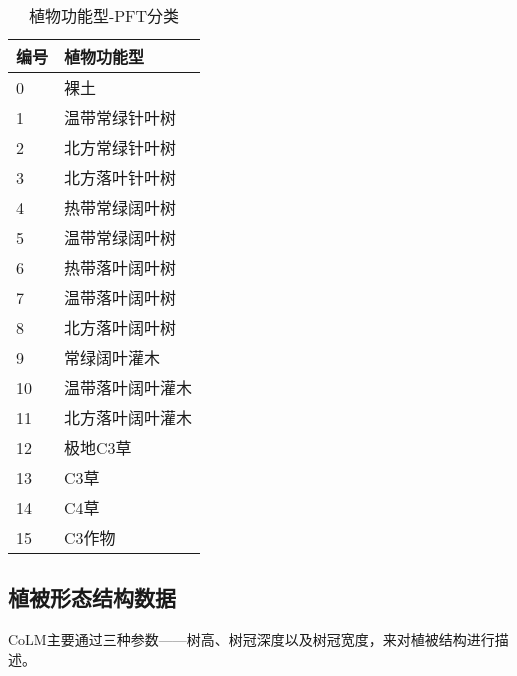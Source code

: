 \begin{table}[htbp]
  \centering
  \caption{植物功能型-PFT分类}
  \label{tab:PFT分类}
  \begin{tabular}{ll}
    \toprule
    \multicolumn{1}{l}{编号} & \multicolumn{1}{l}{植物功能型} \\ \midrule
    0                        & 裸土                           \\
    1                        & 温带常绿针叶树                 \\
    2                        & 北方常绿针叶树                 \\
    3                        & 北方落叶针叶树                 \\
    4                        & 热带常绿阔叶树                 \\
    5                        & 温带常绿阔叶树                 \\
    6                        & 热带落叶阔叶树                 \\
    7                        & 温带落叶阔叶树                 \\
    8                        & 北方落叶阔叶树                 \\
    9                        & 常绿阔叶灌木                   \\
    10                       & 温带落叶阔叶灌木               \\
    11                       & 北方落叶阔叶灌木               \\
    12                       & 极地C3草                       \\
    13                       & C3草                           \\
    14                       & C4草                           \\
    15                       & C3作物                         \\ \bottomrule
  \end{tabular}
\end{table}

\subsection{植被形态结构数据}\label{植被形态结构数据}
%
CoLM主要通过三种参数——树高、树冠深度以及树冠宽度，来对植被结构进行描述。

